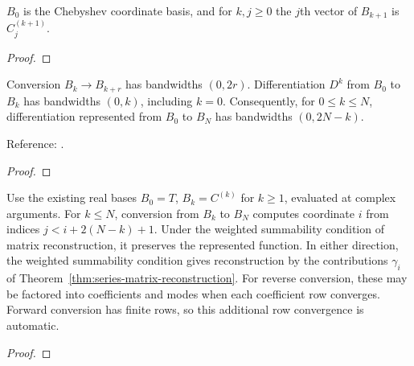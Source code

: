 \begin{supporting}
\begin{theorem}
\label{thm:ultraspherical-ladder-vectors}
\leanok
$B_0$ is the Chebyshev coordinate basis, and for $k,j\ge0$ the $j$th vector of
$B_{k+1}$ is $C_j^{(k+1)}$.
\end{theorem}
\begin{proof}
\leanok
\end{proof}
\end{supporting}


\begin{theorem}
\label{thm:ultraspherical-ladder}
\leanok
Conversion $B_k\to B_{k+r}$ has bandwidths $(0,2r)$.
Differentiation $D^k$ from $B_0$ to $B_k$ has bandwidths $(0,k)$, including $k=0$.
Consequently, for $0\le k\le N$, differentiation represented from $B_0$ to
$B_N$ has bandwidths $(0,2N-k)$.

Reference: \cite[Section 3]{olver-townsend}.
\end{theorem}
\begin{proof}
\leanok
\end{proof}

\begin{theorem}
\label{thm:ultraspherical-series-conversion}
\leanok
Use the existing real bases $B_0=T$, $B_k=C^{(k)}$ for $k\ge1$, evaluated
at complex arguments. For $k\le N$, conversion from $B_k$ to $B_N$ computes
coordinate $i$ from indices $j<i+2(N-k)+1$. Under the weighted summability
condition of matrix reconstruction, it preserves the represented function.
In either direction, the weighted summability condition gives reconstruction
by the contributions $\gamma_i$ of Theorem~\ref{thm:series-matrix-reconstruction}.
For reverse conversion, these may be factored into coefficients and modes
when each coefficient row converges. Forward conversion has finite rows,
so this additional row convergence is automatic.
\end{theorem}
\begin{proof}
\leanok
\end{proof}

